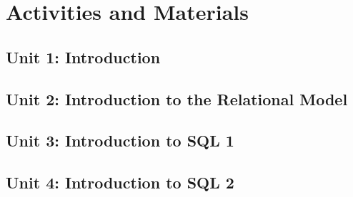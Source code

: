 \section{Activities and Materials}

\subsection{Unit 1: Introduction}





\subsection{Unit 2: Introduction to the Relational Model}








\subsection{Unit 3: Introduction to SQL 1}








\subsection{Unit 4: Introduction to SQL 2}

